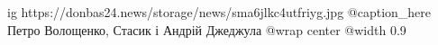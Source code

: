  
 
 
 
 

\ifcmt
  ig https://donbas24.news/storage/news/sma6jlkc4utfriyg.jpg
	@caption_here Петро Волощенко, Стасик і Андрій Джеджула
  @wrap center
  @width 0.9
\fi
